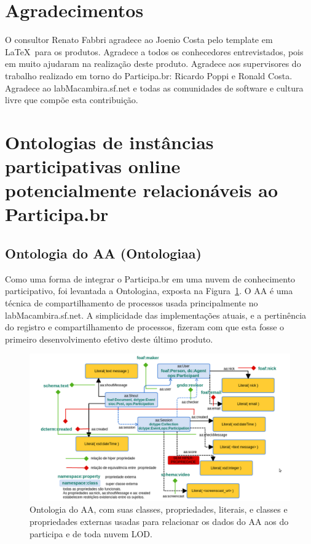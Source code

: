 \documentclass[12pt]{article}
\begin{document}
\section{Agradecimentos}
O consultor Renato Fabbri agradece ao Joenio Costa pelo template em \LaTeX\ para os produtos. Agradece a todos os conhecedores entrevistados, pois em muito ajudaram na realização deste produto. Agradece aos supervisores do trabalho realizado em torno do Participa.br: Ricardo Poppi e Ronald Costa. Agradece ao labMacambira.sf.net e todas as comunidades de software e cultura livre que compõe esta contribuição.
\newpage

\newpage

\newpage
\printindex
\newpage
%
\appendix
\section{Ontologias de instâncias participativas online potencialmente relacionáveis ao Participa.br}
\subsection{Ontologia do AA (Ontologiaa)}\label{ap:aa}
Como uma forma de integrar o Participa.br em uma nuvem de conhecimento participativo, foi levantada a Ontologiaa, exposta na Figura~\ref{fig:diaa}. O AA é uma técnica de compartilhamento de processos usada principalmente no labMacambira.sf.net. A simplicidade das implementações atuais, e a pertinência do registro e compartilhamento de processos, fizeram com que esta fosse o primeiro desenvolvimento efetivo deste último produto.

\begin{figure}[h!]
  \centering
    \includegraphics[width=\textwidth]{../figs/ontologiaa.png}
  \caption{Ontologia do AA, com suas classes, propriedades, literais, e classes e propriedades externas usadas para relacionar os dados do AA aos do participa e de toda nuvem LOD.}\label{fig:diaa}
\end{figure}
\end{document}
